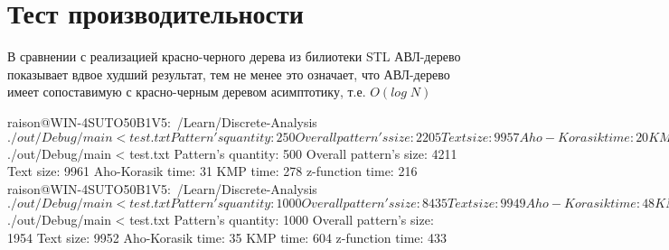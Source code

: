 \section{Тест производительности}
В сравнении с реализацией красно-черного дерева из билиотеки STL АВЛ-дерево показывает вдвое худший результат, тем не менее это означает, что АВЛ-дерево имеет сопоставимую с красно-черным деревом асимптотику, т.е. $O(log\; N)$
\begin{verbatim*}
raison@WIN-4SUTO50B1V5:~/Learn/Discrete-Analysis$ ./out/Debug/main < test.txt
Pattern's quantity: 250
Overall pattern's size: 2205
Text size: 9957
Aho-Korasik time: 20
KMP time: 164
z-function time: 103
raison@WIN-4SUTO50B1V5:~/Learn/Discrete-Analysis$ ./out/Debug/main < test.txt 
Pattern's quantity: 500
Overall pattern's size: 4211
Text size: 9961
Aho-Korasik time: 31
KMP time: 278
z-function time: 216
raison@WIN-4SUTO50B1V5:~/Learn/Discrete-Analysis$ ./out/Debug/main < test.txt 
Pattern's quantity: 1000
Overall pattern's size: 8435
Text size: 9949
Aho-Korasik time: 48
KMP time: 562
z-function time: 429
raison@WIN-4SUTO50B1V5:~/Learn/Discrete-Analysis$ ./out/Debug/main < test.txt
Pattern's quantity: 1000
Overall pattern's size: 1954
Text size: 9952
Aho-Korasik time: 35
KMP time: 604
z-function time: 433
\end{verbatim*}

\pagebreak

